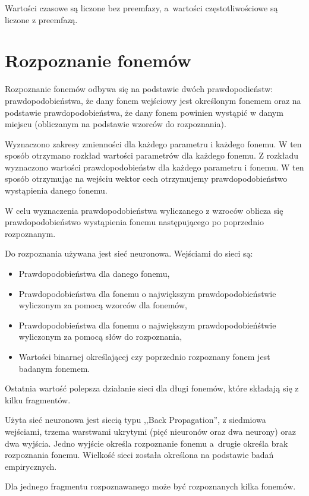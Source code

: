 Wartości czasowe są liczone bez preemfazy, a~wartości częstotliwościowe są liczone z preemfazą.

\section{Rozpoznanie fonemów}
\label{sec:rozpoznanie}

Rozpoznanie fonemów odbywa się na podstawie dwóch prawdopodieństw: prawdopodobieństwa, że dany fonem wejściowy jest określonym fonemem oraz na podstawie prawdopodobieństwa, że dany fonem powinien wystąpić w danym miejscu (obliczanym na podstawie wzorców do rozpoznania).

Wyznaczono zakresy zmienności dla każdego parametru i każdego fonemu. W ten sposób otrzymano rozkład wartości parametrów dla każdego fonemu. Z rozkładu wyznaczono wartości prawdopodobieństw dla każdego parametru i fonemu. W ten sposób otrzymując na wejściu wektor cech otrzymujemy prawdopodobieństwo wystąpienia danego fonemu.

W celu wyznaczenia prawdopodobieństwa wyliczanego z wzroców oblicza się prawdopodobieństwo wystąpienia fonemu następującego po poprzednio rozpoznanym.

Do rozpoznania używana jest sieć neuronowa. Wejściami do sieci są:
\begin{itemize}
    \item Prawdopodobieństwa dla danego fonemu,
    \item Prawdopodobieństwa dla fonemu o największym prawdopodobieństwie wyliczonym za pomocą wzorców dla fonemów,
    \item Prawdopodobieństwa dla fonemu o największym prawdopodobieńśtwie wyliczonym za pomocą słów do rozpoznania,
    \item Wartości binarnej określającej czy poprzednio rozpoznany fonem jest badanym fonemem.
\end{itemize}

Ostatnia wartość polepsza działanie sieci dla długi fonemów, które składają się z kilku fragmentów.

Użyta sieć neuronowa jest siecią typu ,,Back Propagation'', z siedmiowa wejściami, trzema warstwami ukrytymi (pięć nieuronów oraz dwa neurony) oraz dwa wyjścia. Jedno wyjście określa rozpoznanie fonemu a~drugie określa brak rozpoznania fonemu. Wielkość sieci została określona na podstawie badań empirycznych.

Dla jednego fragmentu rozpoznawanego może być rozpoznanych kilka fonemów.


